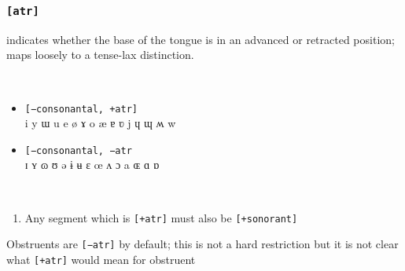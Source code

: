 \documentclass[10pt,letterpaper]{article}
\begin{document}
\subsubsection{\texttt{[atr]}}
\label{ssub:feature_atr}
\begin{samepage}
\begin{description}
\itemsep1pt \parskip0pt  
\item[Descritpion] indicates whether the base of the tongue is in an advanced or retracted position; maps loosely to a tense-lax distinction.
\item[Type]
\item[Examples]\ 
  \begin{itemize}
    \item \texttt{[−consonantal, +atr]}\\
    i y ɯ u e ø ɤ o æ ɐ ʋ j ɥ ɰ ʍ w 
    \item \texttt{[−consonantal, −atr}\\
    ɪ ʏ ɷ ʊ ə ɨ ʉ ɛ œ ʌ ɔ a ɶ ɑ ɒ
  \end{itemize}
\item[Constraints]\
  \begin{enumerate}
    \item Any segment which is \texttt{[+atr]} must also be \texttt{[+sonorant]}
  \end{enumerate}
\item[Resctrictions] Obstruents are \texttt{[−atr]} by default; this is not a hard restriction but it is not clear what \texttt{[+atr]} would mean for obstruent\\
\end{description}
\end{samepage}
\end{document}

